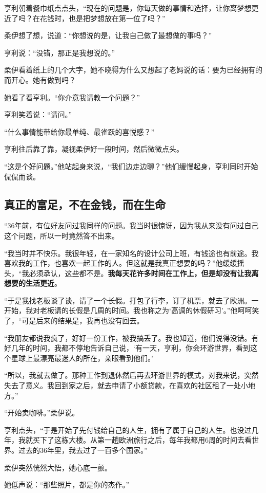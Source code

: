 亨利朝着餐巾纸点点头，“现在的问题是，你每天做的事情和选择，让你离梦想更近了吗？在花钱时，也是把梦想放在第一位了吗？”

柔伊想了想，说道：“你想说的是，让我自己做了最想做的事吗？”

亨利说：“没错，那正是我想说的。”

柔伊看着纸上的几个大字，她不晓得为什么又想起了老妈说的话：要为已经拥有的而开心。她有做到吗？

她看了看亨利。“你介意我请教一个问题？”

亨利笑着说：“请问。”

“什么事情能带给你最单纯、最雀跃的喜悦感？”

亨利往后靠了靠，凝视柔伊好一段时间，然后微微点头。

“这是个好问题。”他站起身来说，“我们边走边聊？”他们缓慢起身，亨利同时开始侃侃而谈。

\subsection{真正的富足，不在金钱，而在生命}

“36年前，有位好友问过我同样的问题。我当时很惊讶，因为我从来没有问过自己这个问题，所以一时竟然答不出来。

“我当时并不快乐。我很年轻，在一家知名的设计公司上班，有钱途也有前途。我喜欢我的工作，也喜欢一起工作的人。但这就是我真正想要的吗？”他缓缓摇头，“我必须承认，这些都不是。\textbf{我每天花许多时间在工作上，但是却没有让我离想要的生活更近}。

“于是我找老板谈了谈，请了一个长假。打包了行李，订了机票，就去了欧洲。一开始，我对老板请的长假是几周的时间。我也称之为‘高调的休假研习’。”他呵呵笑了，“可是后来的结果是，我再也没有回去。

“我朋友都说我疯了，好好一份工作，被我搞丢了。我也知道，他们说得没错。有好几年的时间，我都不停地告诉自己说，‘有一天，亨利，你会环游世界，看到这个星球上最漂亮最迷人的所在，亲眼看到他们。’

“所以，我就去做了。那种工作到退休然后再去环游世界的模式，对我来说，突然失去了意义。我回到家之后，就去申请了小额贷款，在喜欢的社区租了一处小地方。”

“开始卖咖啡。”柔伊说。

亨利点头，“于是开始了先付钱给自己的人生，拥有了属于自己的人生。也没过几年，我就买下了这栋大楼。从第一趟欧洲旅行之后，每年我都用6周的时间去看世界。过去的36年里，我去过了一百多个国家。”

柔伊突然恍然大悟，她心底一颤。

她低声说：“那些照片，都是你的杰作。”

